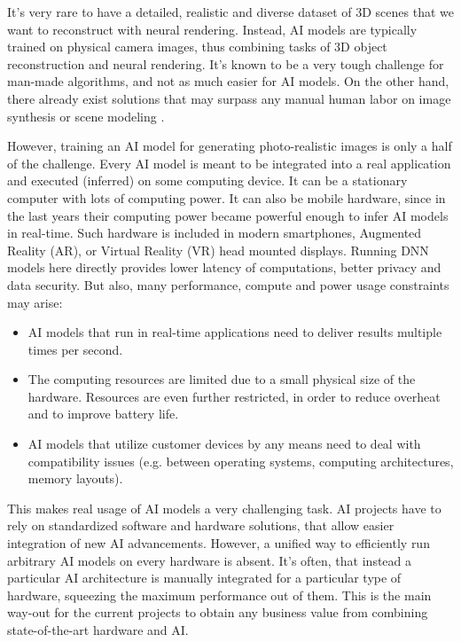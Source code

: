It's very rare to have a detailed, realistic and diverse dataset of 3D scenes that we want to reconstruct with neural rendering. Instead, AI models are typically trained on physical camera images, thus combining tasks of 3D object reconstruction and neural rendering. It's known to be a very tough challenge for man-made algorithms, and not as much easier for AI models. On the other hand, there already exist solutions that may surpass any manual human labor on image synthesis or scene modeling \cite{dnn:stylegan-v1-19,dnn:stylegan-v2-20,dnn:stylegan-v3-21,dnn:nerf20}.
 
However, training an AI model for generating photo-realistic images is only a half of the challenge. Every AI model is meant to be integrated into a real application and executed (inferred) on some computing device. It can be a stationary computer with lots of computing power. It can also be mobile hardware, since in the last years their computing power became powerful enough to infer AI models in real-time. Such hardware is included in modern smartphones, Augmented Reality (AR), or Virtual Reality (VR) head mounted displays. Running DNN models here directly provides lower latency of computations, better privacy and data security. But also, many performance, compute and power usage constraints may arise:
\begin{itemize}
	\item  AI models that run in real-time applications need to deliver results multiple times per second.
	\item  The computing resources are limited due to a small physical size of the hardware. Resources are even further restricted, in order to reduce overheat and to improve battery life.
	\item  AI models that utilize customer devices by any means need to deal with compatibility issues (e.g. between operating systems, computing architectures, memory layouts).
\end{itemize}

This makes real usage of AI models a very challenging task. AI projects have to rely on standardized software and hardware solutions, that allow easier integration of new AI advancements. However, a unified way to efficiently run arbitrary AI models on every hardware is absent. It's often, that instead a particular AI architecture is manually integrated for a particular type of hardware, squeezing the maximum performance out of them. This is the main way-out for the current projects to obtain any business value from combining state-of-the-art hardware and AI.
 
